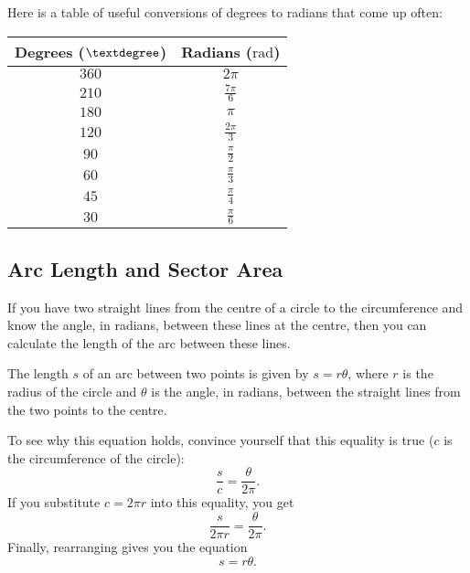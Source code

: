 \documentclass[
  12pt,
  a4paper, oneside]{starmastarticle}
\begin{document}
Here is a table of useful conversions of degrees to radians that come up
often:

\begin{longtable}[]{@{}cc@{}}
\toprule()
Degrees (\(\textdegree\)) & Radians (\(\textrm{rad}\)) \\
\midrule()
\endhead
\(360\) & \(2 \pi\) \\
\(210\) & \(\frac{7\pi}{6}\) \\
\(180\) & \(\pi\) \\
\(120\) & \(\frac{2\pi}{3}\) \\
\(90\) & \(\frac{\pi}{2}\) \\
\(60\) & \(\frac{\pi}{3}\) \\
\(45\) & \(\frac{\pi}{4}\) \\
\(30\) & \(\frac{\pi}{6}\) \\
\bottomrule()
\end{longtable}

\hypertarget{arc-length-and-sector-area}{%
\subsection{Arc Length and Sector
Area}\label{arc-length-and-sector-area}}

If you have two straight lines from the centre of a circle to the
circumference and know the angle, in radians, between these lines at the
centre, then you can calculate the length of the arc between these
lines.

\begin{tcolorbox}[enhanced jigsaw, breakable, toptitle=1mm, toprule=.15mm, titlerule=0mm, colframe=quarto-callout-note-color-frame, colback=white, colbacktitle=quarto-callout-note-color!10!white, coltitle=black, opacityback=0, leftrule=.75mm, bottomrule=.15mm, opacitybacktitle=0.6, arc=.35mm, bottomtitle=1mm, title=\textcolor{quarto-callout-note-color}{\faInfo}\hspace{0.5em}{Equation for arc length}, rightrule=.15mm, left=2mm]
The length \(s\) of an arc between two points is given by
\(s = r \theta\), where \(r\) is the radius of the circle and \(\theta\)
is the angle, in radians, between the straight lines from the two points
to the centre.
\end{tcolorbox}

To see why this equation holds, convince yourself that this equality is
true (\(c\) is the circumference of the circle):
\[\frac{s}{c} = \frac{\theta}{2\pi}.\] If you substitute \(c = 2\pi r\)
into this equality, you get \[\frac{s}{2\pi r} = \frac{\theta}{2\pi}.\]
Finally, rearranging gives you the equation \[s = r \theta.\]
\end{document}
